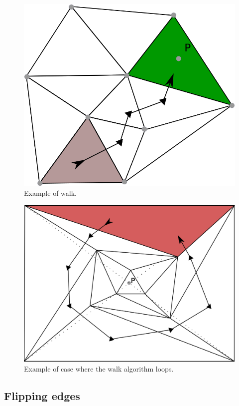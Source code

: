 \documentclass[a4paper,10pt]{article}
\begin{document}
\begin{figure}
  \centering
\includegraphics[scale=1]{Walk}
  \caption{\label{walk} Example of walk.}
\end{figure}

\begin{figure}
  \centering
\includegraphics[scale=1]{Loop}
  \caption{\label{loop} Example of case where the walk algorithm loops.}
\end{figure}

\subsection{Flipping edges}
\label{step2}
\end{document}
